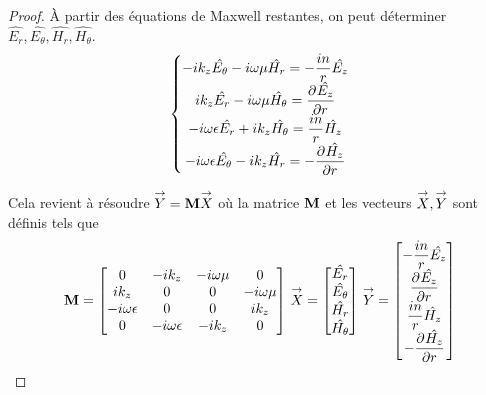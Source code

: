     \begin{proof}
        À partir des équations de Maxwell restantes, on peut déterminer \(\hat{E_r},\hat{E_\theta},\hat{H_r},\hat{H_\theta}\).
        \begin{equation}
            \left\lbrace
            \begin{matrix}
                -ik_z\hat{E_\theta} - i\w\mu \hat{H_r} = -\frac{in}{r}\hat{E_z}
                \\
                ik_z\hat{E_r} - i\w\mu \hat{H_\theta} = \ddr{r}{\hat{E_z}}
                \\
                -i\w\eps \hat{E_r} + ik_z \hat{H_\theta} = \frac{in}{r}\hat{H_z}
                \\
                -i\w\eps \hat{E_\theta} - ik_z \hat{H_r} = -\ddr{r}{\hat{H_z}}
            \end{matrix}
            \right.
        \end{equation}

        Cela revient à résoudre \(\vect{Y} = \mat{M}\vect{X}\) où la matrice \(\mat{M}\) et les vecteurs \(\vect{X}, \vect{Y}\) sont définis tels que
        \begin{equation}
            \mat{M} =
            \begin{bmatrix}
            0 & -ik_z & -i\w\mu & 0 
            \\
            ik_z & 0 & 0 & -i\w\mu
            \\
            -i\w\eps & 0 & 0 & ik_z
            \\
            0 & -i\w\eps & -ik_z & 0
            \end{bmatrix}
            \,
            \vect{X} = 
            \begin{bmatrix}
                \hat{E_r}\\
                \hat{E_\theta}\\
                \hat{H_r}\\
                \hat{H_\theta}
            \end{bmatrix}
            \,
            \vect{Y} = 
            \begin{bmatrix}
                -\frac{in}{r}\hat{E_z}\\
                \ddr{r}{\hat{E_z}}\\
                \frac{in}{r}\hat{H_z}\\
                -\ddr{r}{\hat{H_z}}
            \end{bmatrix}
        \end{equation}


\end{proof}
